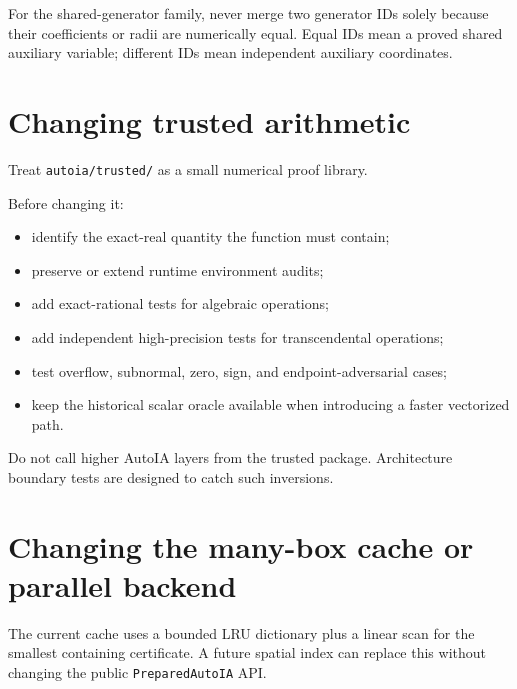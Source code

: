 \documentclass[11pt]{article}
\newcommand{\codepath}[1]{\nolinkurl{#1}}
\begin{document}
For the shared-generator family, never merge two generator IDs solely because
their coefficients or radii are numerically equal.  Equal IDs mean a proved
shared auxiliary variable; different IDs mean independent auxiliary coordinates.

\section{Changing trusted arithmetic}

Treat \codepath{autoia/trusted/} as a small numerical proof library.

Before changing it:
\begin{itemize}[leftmargin=*]
\item identify the exact-real quantity the function must contain;
\item preserve or extend runtime environment audits;
\item add exact-rational tests for algebraic operations;
\item add independent high-precision tests for transcendental operations;
\item test overflow, subnormal, zero, sign, and endpoint-adversarial cases;
\item keep the historical scalar oracle available when introducing a faster
vectorized path.
\end{itemize}

Do not call higher AutoIA layers from the trusted package.  Architecture boundary
tests are designed to catch such inversions.

\section{Changing the many-box cache or parallel backend}

The current cache uses a bounded LRU dictionary plus a linear scan for the
smallest containing certificate.  A future spatial index can replace this
without changing the public \texttt{PreparedAutoIA} API.
\end{document}
